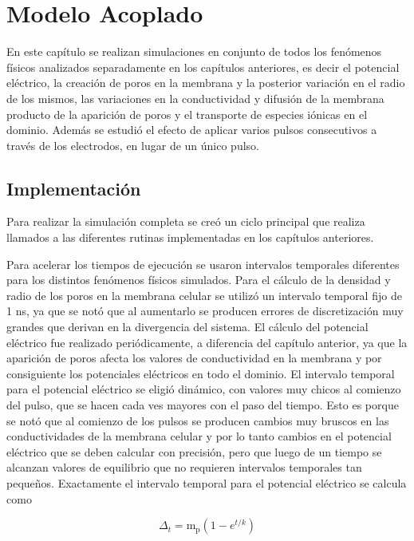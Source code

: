 \chapter{Modelo Acoplado} \label{chap:acoplado}

En este capítulo se realizan simulaciones en conjunto de todos los fenómenos físicos analizados separadamente en los capítulos anteriores, es decir el potencial eléctrico, la creación de poros en la membrana y la posterior variación en el radio de los mismos, las variaciones en la conductividad y difusión de la membrana producto de la aparición de poros y el transporte de especies iónicas en el dominio. Además se estudió el efecto de aplicar varios pulsos consecutivos a través de los electrodos, en lugar de un único pulso.

\section{Implementación}
Para realizar la simulación completa se creó un ciclo principal que realiza llamados a las diferentes rutinas implementadas en los capítulos anteriores.

Para acelerar los tiempos de ejecución se usaron intervalos temporales diferentes para los distintos fenómenos físicos simulados. Para el cálculo de la densidad y radio de los poros en la membrana celular se utilizó un intervalo temporal fijo de 1 \si{\nano\second}, ya que se notó que al aumentarlo se producen errores de discretización muy grandes que derivan en la divergencia del sistema. El cálculo del potencial eléctrico fue realizado periódicamente, a diferencia del capítulo anterior, ya que la aparición de poros afecta los valores de conductividad en la membrana y por consiguiente los potenciales eléctricos en todo el dominio. El intervalo temporal para el potencial eléctrico se eligió dinámico, con valores muy chicos al comienzo del pulso, que se hacen cada ves mayores con el paso del tiempo. Esto es porque se notó que al comienzo de los pulsos se producen cambios muy bruscos en las conductividades de la membrana celular y por lo tanto cambios en el potencial eléctrico que se deben calcular con precisión, pero que luego de un tiempo se alcanzan valores de equilibrio que no requieren intervalos temporales tan pequeños. Exactamente el intervalo temporal para el potencial eléctrico se calcula como

\begin{equation}
	\Delta_t = \mathrm{m_p} \left( 1 - e^{t/k} \right)
\end{equation}

